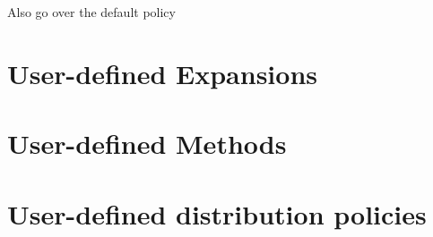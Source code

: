 Also go over the default policy



\section{User-defined Expansions}



\section{User-defined Methods}



\section{User-defined distribution policies}

